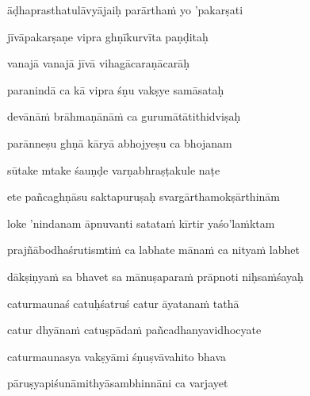 āḍhaprasthatulāvyājaiḥ parārtha\.m yo 'pakarṣati \veg\dontdisplaylinenum

jīvāpakarṣaṇe vipra ghṇīkurvīta paṇḍitaḥ\thinspace{\dandab} \dontdisplaylinenum

vanajā vanajā jīvā vihagācaraṇācarāḥ \veg\dontdisplaylinenum

paranindā ca kā vipra śṇu vakṣye samāsataḥ\thinspace{\dandab} \dontdisplaylinenum

devānā\.m brāhmaṇānā\.m ca gurumātātithidviṣaḥ \veg\dontdisplaylinenum

parānneṣu ghṇā kāryā abhojyeṣu ca bhojanam\thinspace{\dandab} \dontdisplaylinenum

sūtake mtake śauṇḍe varṇabhraṣṭakule naṭe \veg\dontdisplaylinenum

\ujvers\nemsloka 
ete pañcaghṇāsu saktapuruṣaḥ svargārthamokṣārthinām
\dontdisplaylinenum

\nemslokab 
loke 'nindanam āpnuvanti satata\.m kīrtir yaśo'la\.mktam \danda\dontdisplaylinenum

\nemslokac 
prajñābodhaśrutismti\.m ca labhate māna\.m ca nitya\.m labhet
\dontdisplaylinenum

\nemslokad 
dākṣiṇya\.m sa bhavet sa mānuṣapara\.m prāpnoti niḥsa\.mśayaḥ \veg\dontdisplaylinenum


\vers

caturmaunaś catuḥśatruś catur āyatana\.m tathā\thinspace{\dandab} \dontdisplaylinenum

catur dhyāna\.m catuṣpāda\.m pañcadhanyavidhocyate \veg\dontdisplaylinenum

caturmaunasya vakṣyāmi śṇuṣvāvahito bhava\thinspace{\dandab} \dontdisplaylinenum

pāruṣyapiśunāmithyāsambhinnāni ca varjayet \veg\dontdisplaylinenum


